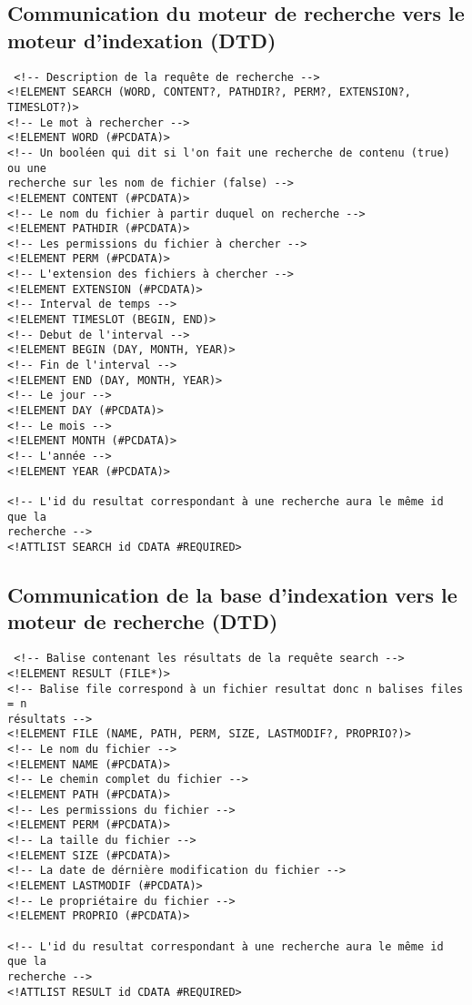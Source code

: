\subsection{Communication du moteur de recherche vers le moteur d'indexation (DTD)}
\begin{verbatim}
 <!-- Description de la requête de recherche -->
<!ELEMENT SEARCH (WORD, CONTENT?, PATHDIR?, PERM?, EXTENSION?, TIMESLOT?)>
<!-- Le mot à rechercher -->
<!ELEMENT WORD (#PCDATA)>
<!-- Un booléen qui dit si l'on fait une recherche de contenu (true) ou une 
recherche sur les nom de fichier (false) -->
<!ELEMENT CONTENT (#PCDATA)>
<!-- Le nom du fichier à partir duquel on recherche -->
<!ELEMENT PATHDIR (#PCDATA)>
<!-- Les permissions du fichier à chercher -->
<!ELEMENT PERM (#PCDATA)>
<!-- L'extension des fichiers à chercher -->
<!ELEMENT EXTENSION (#PCDATA)>
<!-- Interval de temps -->
<!ELEMENT TIMESLOT (BEGIN, END)>
<!-- Debut de l'interval -->
<!ELEMENT BEGIN (DAY, MONTH, YEAR)>
<!-- Fin de l'interval -->
<!ELEMENT END (DAY, MONTH, YEAR)>
<!-- Le jour -->
<!ELEMENT DAY (#PCDATA)>
<!-- Le mois -->
<!ELEMENT MONTH (#PCDATA)>
<!-- L'année -->
<!ELEMENT YEAR (#PCDATA)>

<!-- L'id du resultat correspondant à une recherche aura le même id que la 
recherche -->
<!ATTLIST SEARCH id CDATA #REQUIRED>
\end{verbatim}

\subsection{Communication de la base d'indexation vers le moteur de recherche (DTD)}
\begin{verbatim}
 <!-- Balise contenant les résultats de la requête search -->
<!ELEMENT RESULT (FILE*)>
<!-- Balise file correspond à un fichier resultat donc n balises files = n 
résultats -->
<!ELEMENT FILE (NAME, PATH, PERM, SIZE, LASTMODIF?, PROPRIO?)>
<!-- Le nom du fichier -->
<!ELEMENT NAME (#PCDATA)>
<!-- Le chemin complet du fichier -->
<!ELEMENT PATH (#PCDATA)>
<!-- Les permissions du fichier -->
<!ELEMENT PERM (#PCDATA)>
<!-- La taille du fichier -->
<!ELEMENT SIZE (#PCDATA)>
<!-- La date de dérnière modification du fichier -->
<!ELEMENT LASTMODIF (#PCDATA)>
<!-- Le propriétaire du fichier -->
<!ELEMENT PROPRIO (#PCDATA)>

<!-- L'id du resultat correspondant à une recherche aura le même id que la 
recherche -->
<!ATTLIST RESULT id CDATA #REQUIRED>
\end{verbatim}
